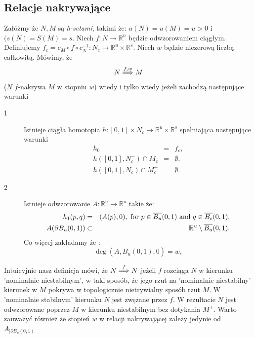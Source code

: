 \subsection{Relacje nakrywające}
\begin{definition} \cite{ZGi}
\label{def:covw} 
Załóżmy że $N,M$ są {\em h-setami}, takimi że: $u(N)=u(M)=u > 0$ i $(s(N)=S(M)=s$.
Niech $f:N \to {\mathbb R}^n$ będzie odwzorowaniem ciągłym. 
Definiujemy $f_c = c_M \circ f \circ c_N^{-1}: N_c \to {\mathbb R}^u \times {\mathbb R}^s $.
Niech $w$ będzie niezerową liczbą całkowitą. 
Mówimy, że 
\begin{displaymath}
  N\stackrel{f,w}{\Longrightarrow} M
\end{displaymath}
($N$ $f$-nakrywa $M$ w stopniu $w$) wtedy i tylko wtedy jeżeli zachodzą następujące warunki
\begin{description}
\item[1] 
   Istnieje ciągła homotopia $h:[0,1]\times N_c \to {\mathbb R}^u \times {\mathbb R}^s$ spełniająca następujące
   warunki
   \begin{eqnarray}
      h_0&=&f_c,  \label{eq:hc1} \\
      h([0,1],N_c^-) \cap M_c &=& \emptyset ,  \label{eq:hc2} \\
      h([0,1],N_c) \cap M_c^+ &=& \emptyset .\label{eq:hc3}
   \end{eqnarray}
\item[2] 
	Istnieje odwzorowanie $A:{\mathbb R} ^u \to {\mathbb R}^u$ takie że:
   \begin{eqnarray}
    h_1(p,q)&=&(A(p),0), \mbox{ for $p \in \overline{B_u}(0,1)$ and $ q \in
    \overline{B_s}(0,1)$,}\label{eq:hc4}\\
      A(\partial B_u(0,1)) &\subset & {\mathbb R}^u \setminus
      \overline{B_u}(0,1).  \label{eq:mapaway}
   \end{eqnarray}
  Co więcej zakładamy że :
\begin{displaymath}
  \deg(A,\overline {B_u}(0,1),0)=w,
\end{displaymath}
\end{description}
\end{definition}

Intuicyjnie nasz definicja mówi, że $N \stackrel{f}{\Longrightarrow} N$ jeżeli $f$ rozciąga $N$ w kierunku
'nominalnie niestabilnym', w taki sposób, że jego rzut na 
'nominalnie niestabilny' kierunek w $M$ pokrywa w topologicznie nietrywialny sposób rzut $M$.
W 'nominalnie stabilnym' kierunku $N$ jest zwężane przez $f$. W rezultacie $N$ jest odwzorowane
poprzez $M$ w kierunku niestabilnym bez dotykania $M^+$. 
Warto zauważyć również że stopień $w$ w relacji nakrywającej zależy jedynie
od $A_{|\partial B_u(0,1)}$


